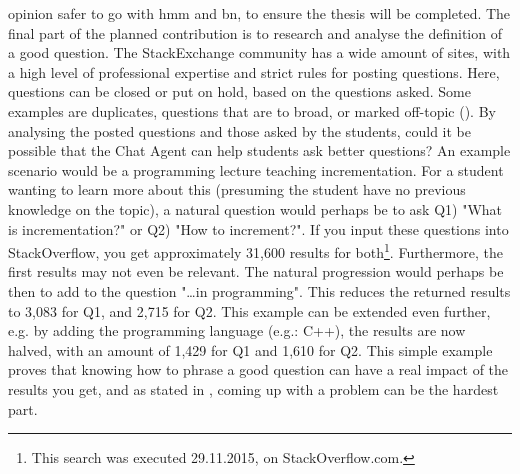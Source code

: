 opinion safer to go with \gls{hmm} and \gls{bn}, to ensure the thesis will be completed. 
\vspace{0.5em}\newline
The final part of the planned contribution is to research and analyse the definition of a good question. The StackExchange community has a wide amount of sites, with a high level 
of professional expertise and strict rules for posting questions. Here, questions can be closed or put on hold, based on the questions asked. Some examples are duplicates, questions 
that are to broad, or marked off-topic (\citet{Stackoverflow.com2015,CommunityWiki2015}). By analysing the posted questions and those asked by the students, could it be possible 
that the Chat Agent can help students ask better questions? 
\vspace{0.5em}\newline
An example scenario would be a programming lecture teaching incrementation. For a student wanting to learn more about this 
(presuming the student have no previous knowledge on the topic), a natural question would perhaps be to ask Q1) "What is incrementation?" or Q2) "How to increment?". If you input 
these questions into StackOverflow, you get approximately 31,600 results for both\footnote{This search was executed 29.11.2015, on StackOverflow.com.}. Furthermore, the first results 
may not even be relevant. The natural progression would perhaps be then to add to the question "\ldots in programming". This reduces the returned results to 3,083 for Q1, and 2,715 
for Q2. This example can be extended even further, e.g. by adding the programming language (e.g.: C++), the results are now halved, with an amount of 1,429 for Q1 and 1,610 for Q2. 
This simple example proves that knowing how to phrase a good question can have a real impact of the results you get, and as stated in \citet{Lucky2011}, coming up with a problem can be 
the hardest part.
